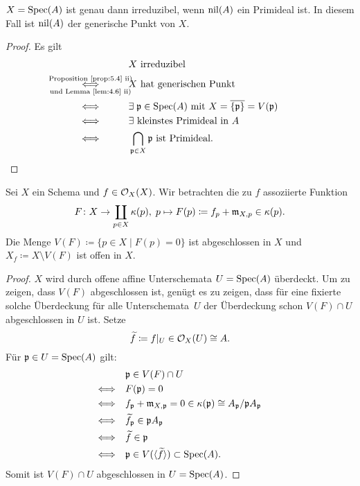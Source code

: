 \begin{lem}
\label{lem:6.3}
	$X=\operatorname{Spec}(A)$ ist genau dann irreduzibel, wenn $\operatorname{nil}(A)$ ein Primideal ist. In diesem Fall ist $\operatorname{nil}(A)$ der generische Punkt von $X$.
	\begin{proof}
		Es gilt
		\begin{align*}
			&X \text{ irreduzibel}\\
                        \underset{\mathclap{\text{und Lemma~\ref{lem:4.6} ii)}}}{\overset{\mathclap{\text{Proposition~\ref{prop:5.4} ii)}}}{\Longleftrightarrow}} \qquad\quad & X \text{ hat generischen Punkt}\\
			 \Longleftrightarrow \qquad\quad & \exists\; \mfp \in \Spec(A) \text{ mit } X = \overline{\{\mfp\}} = V(\mfp)\\
			 \Longleftrightarrow \qquad\quad & \exists \text{ kleinstes Primideal in } A\\
			 \Longleftrightarrow \qquad\quad &  \bigcap_{\mfp \in X} \mfp \text{ ist Primideal} .
		\end{align*}
	\end{proof}
\end{lem}

\begin{lem}
\label{lem:6.4}
	Sei $X$ ein Schema und $f \in \mathcal{O}_X(X)$. Wir betrachten die zu $f$ assoziierte Funktion
	\[
		F\colon X \to \coprod_{p \in X}\kappa(p),\; p \mapsto F(p)\coloneqq f_p+\mathfrak{m}_{X,p}\in \kappa(p).
	\]
	Die Menge $V(F) \coloneqq \{p\in X\mid F(p) = 0\}$ ist abgeschlossen in $X$ und $X_f\coloneqq X \setminus V(F)$ ist offen in $X$.
	\begin{proof}
		$X$ wird durch offene affine Unterschemata $U=\operatorname{Spec}(A)$ überdeckt. Um zu zeigen, dass $V(F)$ abgeschlossen ist, genügt es zu zeigen, dass für eine fixierte solche Überdeckung für alle Unterschemata~$U$ der Überdeckung schon $V(F)\cap U$ abgeschlossen in $U$ ist. Setze
		\[
			\widetilde{f}\coloneqq f\vert_U\in \mathcal{O}_X(U) \cong A.
		\]
		Für $\mathfrak{p}\in U = \operatorname{Spec}(A)$ gilt:
		\begin{align*}
			&\mathfrak{p} \in V(F) \cap U\\
			\Longleftrightarrow \quad & F(\mathfrak{p})=0\\
                        \Longleftrightarrow \quad & f_{\mathfrak{p}}+\mathfrak{m}_{X,\mathfrak{p}} = 0 \in \kappa(\mathfrak{p}) \cong A_{\mathfrak{p}}/\mathfrak{p} A_{\mathfrak{p}}\\
			\Longleftrightarrow \quad & \widetilde{f}_{\mathfrak{p}} \in \mathfrak{p} A_{\mathfrak{p}}\\
			\Longleftrightarrow \quad & \widetilde{f} \in \mathfrak{p}\\
			\Longleftrightarrow \quad & \mathfrak{p} \in V(\langle \widetilde{f} \rangle) \subset \operatorname{Spec}(A) .
		\end{align*}
		Somit ist $V(F)\cap U$ abgeschlossen in $U = \operatorname{Spec}(A)$.
	\end{proof}
\end{lem}

